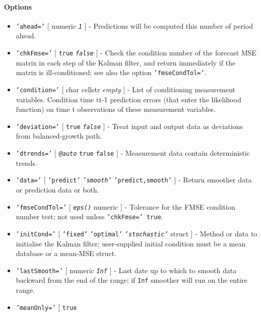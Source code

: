 \paragraph{Options}\label{options}

\begin{itemize}
\item
  \texttt{'ahead='} {[} numeric \textbar{} \emph{\texttt{1}} {]} -
  Predictions will be computed this number of period ahead.
\item
  \texttt{'chkFmse='} {[} \texttt{true} \textbar{} \emph{\texttt{false}}
  {]} - Check the condition number of the forecast MSE matrix in each
  step of the Kalman filter, and return immediately if the matrix is
  ill-conditioned; see also the option \texttt{'fmseCondTol='}.
\item
  \texttt{'condition='} {[} char \textbar{} cellstr \textbar{}
  \emph{empty} {]} - List of conditioning measurement variables.
  Condition time t\textbar{}t-1 prediction errors (that enter the
  likelihood function) on time t observations of these measurement
  variables.
\item
  \texttt{'deviation='} {[} \texttt{true} \textbar{}
  \emph{\texttt{false}} {]} - Treat input and output data as deviations
  from balanced-growth path.
\item
  \texttt{'dtrends='} {[} \emph{\texttt{@auto}} \textbar{} \texttt{true}
  \textbar{} \texttt{false} {]} - Measurement data contain deterministic
  trends.
\item
  \texttt{'data='} {[} \texttt{'predict'} \textbar{}
  \emph{\texttt{'smooth'}} \textbar{} \texttt{'predict,smooth'} {]} -
  Return smoother data or prediction data or both.
\item
  \texttt{'fmseCondTol='} {[} \emph{\texttt{eps()}} \textbar{} numeric
  {]} - Tolerance for the FMSE condition number test; not used unless
  \texttt{'chkFmse=' true}.
\item
  \texttt{'initCond='} {[} \texttt{'fixed'} \textbar{}
  \texttt{'optimal'} \textbar{} \emph{\texttt{'stochastic'}} \textbar{}
  struct {]} - Method or data to initialise the Kalman filter;
  user-supplied initial condition must be a mean database or a mean-MSE
  struct.
\item
  \texttt{'lastSmooth='} {[} numeric \textbar{} \emph{\texttt{Inf}} {]}
  - Last date up to which to smooth data backward from the end of the
  range; if \texttt{Inf} smoother will run on the entire range.
\item
  \texttt{'meanOnly='} {[} \texttt{true} \textbar{}

\end{itemize}
